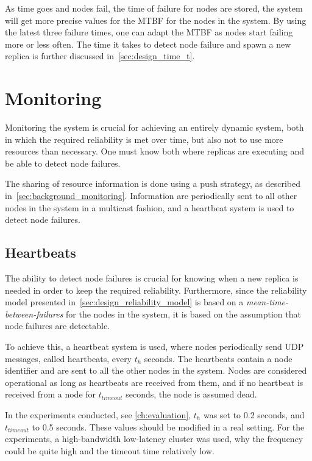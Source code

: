 \documentclass{cslthse-msc}
\begin{document}
As time goes and nodes fail, the time of failure for nodes are stored, the system will get more precise values for the MTBF for the nodes in the system. By using the latest three failure times, one can adapt the MTBF as nodes start failing more or less often. The time it takes to detect node failure and spawn a new replica is further discussed in~\cref{sec:design_time_t}.


\section{Monitoring} \label{sec:design_monitoring}
Monitoring the system is crucial for achieving an entirely dynamic system, both in which the required reliability is met over time, but also not to use more resources than necessary. One must know both where replicas are executing and be able to detect node failures.

The sharing of resource information is done using a push strategy, as described in~\cref{sec:background_monitoring}. Information are periodically sent to all other nodes in the system in a multicast fashion, and a heartbeat system is used to detect node failures.

\subsection{Heartbeats} \label{subsec:heartbeats}
The ability to detect node failures is crucial for knowing when a new replica is needed in order to keep the required reliability. Furthermore, since the reliability model presented in~\cref{sec:design_reliability_model} is based on a \emph{mean-time-between-failures} for the nodes in the system, it is based on the assumption that node failures are detectable. 

To achieve this, a heartbeat system is used, where nodes periodically send UDP messages, called heartbeats, every $t_h$ seconds. The heartbeats contain a node identifier and are sent to all the other nodes in the system. Nodes are considered operational as long as heartbeats are received from them, and if no heartbeat is received from a node for $t_{timeout}$ seconds, the node is assumed dead.

In the experiments conducted, see \cref{ch:evaluation}, $t_h$ was set to 0.2 seconds, and $t_{timeout}$ to 0.5 seconds. These values should be modified in a real setting. For the experiments, a high-bandwidth low-latency cluster was used, why the frequency could be quite high and the timeout time relatively low. 
\end{document}
